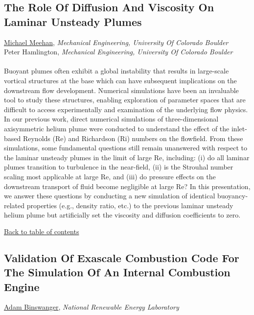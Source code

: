 \hypertarget{MichaelMeehan}{\subsection*{\color{CUGOLD} The Role Of Diffusion And Viscosity On Laminar Unsteady Plumes}} \vsp 
\underline{Michael Meehan}, \textit{Mechanical Engineering, University Of Colorado Boulder}\\ 
{Peter Hamlington}, \textit{Mechanical Engineering, University Of Colorado Boulder}\\ 
\vspace{-0.1 in} \\ 
\noindent Buoyant plumes often exhibit a global instability that results in large-scale vortical structures at the base which can have subsequent implications on the downstream flow development. Numerical simulations have been an invaluable tool to study these structures, enabling exploration of parameter spaces that are difficult to access experimentally and examination of the underlying flow physics. In our previous work, direct numerical simulations of three-dimensional axisymmetric helium plume were conducted to understand the effect of the inlet-based Reynolds (Re) and Richardson (Ri) numbers on the flowfield. From these simulations, some fundamental questions still remain unanswered with respect to the laminar unsteady plumes in the limit of large Re, including: (i) do all laminar plumes transition to turbulence in the near-field, (ii) is the Strouhal number scaling most applicable at large Re, and (iii) do pressure effects on the downstream transport of fluid become negligible at large Re? In this presentation, we answer these questions by conducting a new simulation of identical buoyancy-related properties (e.g., density ratio, etc.) to the previous laminar unsteady helium plume but artificially set the viscosity and diffusion coefficients to zero. \\ 
\begin{flushright}\vspace{-0.2 in}\hyperlink{toc}{Back to table of contents}\end{flushright}\vspace{-0.2 in}
\hypertarget{AdamBinswanger}{\subsection*{\color{CUGOLD} Validation Of Exascale Combustion Code For The Simulation Of An Internal Combustion Engine}} \vsp 
\underline{Adam Binswanger}, \textit{National Renewable Energy Laboratory}\\ 
